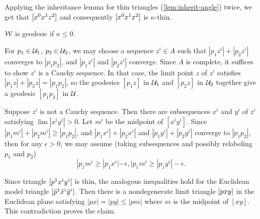 Applying the inheritance lemma for thin triangles (\ref{lem:inherit-angle}) twice, 
we get that $[{x^0}{x^1}{z^2}]$ 
and consequently $[{x^0}{x^1}{x^2}]$ is $\kappa$-thin.
\claimqeds

\begin{clm}{}\label{clm:geod-gluing0 }
$\mathcal{W}$ is geodesic if $\kappa\le0$.
\end{clm}
For $p_1\in \spc{U}_1$, $p_2\in \spc{U}_2$, we may choose a sequence $z^i\in A$ such that $|p_1z^i|+|p_2z^i|$
 converges to $|p_1p_2|$, and $|p_1z^i|$ and $|p_2z^i|$ converge.  
 Since $A$ is complete, it suffices to show $z^i$ is a Cauchy sequence.  
 In that case, the limit point $z$ of $z^i$ satisfies $|p_1z|+|p_2z|=|p_1p_2|$, so the geodesics $[p_1z]$ in $\mathcal{U}_1$ and $[p_2z]$ in $\mathcal{U}_2$ together give a geodesic $[p_1p_2]$ in $\mathcal{U}$.  
 
 Suppose $z^i$ is not a Cauchy sequence.  Then there are subsequences  $x^i$ and $y^i$ of $z^i$ satisfying  $\lim|x^iy^i|>0$. Let $m^i$ be the midpoint of $[x^iy^i]$. Since $|p_1m^i|+|p_2m^i| \ge |p_1p_2|$, and  $|p_1x^i|+|p_2x^i|$ and  $|p_1y^i|+|p_2y^i|$
 converge to $|p_1p_2|$, then for  any $\epsilon >0$, we may assume (taking subsequences and possibly relabeling $p_1$ and $p_2$)
 \[
 |p_1m^i\ge  |p_1x^i|-\epsilon,  |p_1m^i\ge  |p_1y^i|-\epsilon.
 \]
 
 Since triangle $[{p^1}{x^i}{y^i}]$ is thin, the analogous inequalities hold for the Euclidean model triangle  $[{\tilde p^1}{\tilde x^i}{\tilde y^i}]$.  
 Then there is a nondegenerate limit triangle $[{p}{x}{y}]$ in the Euclidean plane satisfying $|px|=|py|\le|pm|$ where $m$ is the midpoint of $[xy]$.  This  contradiction proves the claim.
 
\claimqeds


